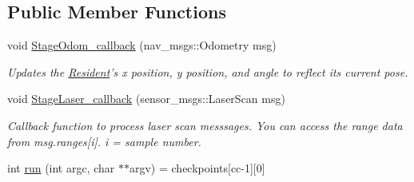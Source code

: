 \subsection*{Public Member Functions}
\begin{DoxyCompactItemize}
\item 
void \hyperlink{classResident_ae1406a27c978147c7816e57f9ed13aed}{Stage\-Odom\-\_\-callback} (nav\-\_\-msgs\-::\-Odometry msg)
\begin{DoxyCompactList}\small\item\em Updates the \hyperlink{classResident}{Resident}'s x position, y position, and angle to reflect its current pose. \end{DoxyCompactList}\item 
void \hyperlink{classResident_a6745ec218b7e451eb7ba2ca88fa2aca9}{Stage\-Laser\-\_\-callback} (sensor\-\_\-msgs\-::\-Laser\-Scan msg)
\begin{DoxyCompactList}\small\item\em Callback function to process laser scan messsages. You can access the range data from msg.\-ranges\mbox{[}i\mbox{]}. i = sample number. \end{DoxyCompactList}\item 
\hypertarget{classResident_aa4cbafa8f6cf586b53a774a8f1d81aa6}{int \hyperlink{classResident_aa4cbafa8f6cf586b53a774a8f1d81aa6}{run} (int argc, char $\ast$$\ast$argv) = checkpoints\mbox{[}cc-\/1\mbox{]}\mbox{[}0\mbox{]}}\label{classResident_aa4cbafa8f6cf586b53a774a8f1d81aa6}


\end{DoxyCompactItemize}
